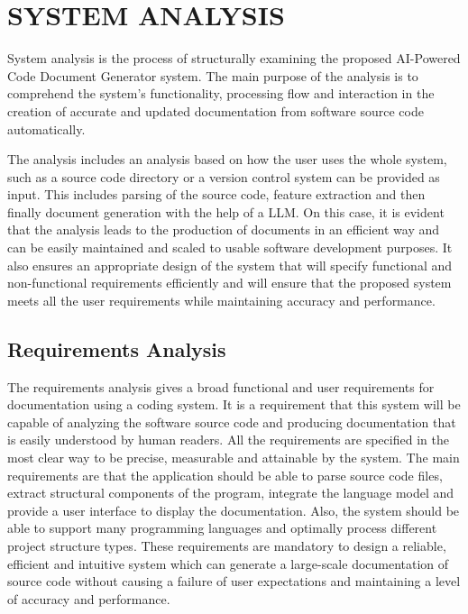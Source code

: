 \chapter{SYSTEM ANALYSIS}
\par
\hspace{0.5cm}
System analysis is the process of structurally examining the proposed AI-Powered Code Document Generator system. The main purpose of the analysis is to comprehend the system’s functionality, processing flow and interaction in the creation of accurate and updated documentation from software source code automatically.

\par The analysis includes an analysis based on how the user uses the whole system, such as a source code directory or a version control system can be provided as input. This includes parsing of the source code, feature extraction and then finally document generation with the help of a LLM. On this case, it is evident that the analysis leads to the production of documents in an efficient way and can be easily maintained and scaled to usable software development purposes. It also ensures an appropriate design of the system that will specify functional and non-functional requirements efficiently and will ensure that the proposed system meets all the user requirements while maintaining accuracy and performance. 

\section{Requirements Analysis}
\hspace{0.5cm}
The requirements analysis gives a broad functional and user requirements for documentation using a  coding system. It is a requirement that this system will be capable of analyzing the software source code and producing documentation that is easily understood by human readers. All the requirements are specified in the most clear way to be precise, measurable and attainable by the system. The main requirements are that the application should be able to parse source code files, extract structural components of the program, integrate the language model and provide a user interface to display the documentation. Also, the system should be able to support many programming languages and optimally process different project structure types. These requirements are mandatory to design a reliable, efficient and intuitive system which can generate a large-scale documentation of source code without causing a failure of user expectations and maintaining a level of accuracy and performance. 
